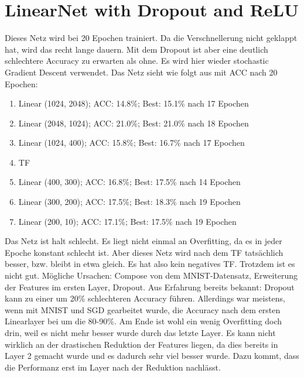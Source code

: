 \section{LinearNet with Dropout and ReLU}
    Dieses Netz wird bei 20 Epochen trainiert. Da die Verschnellerung nicht geklappt hat, 
    wird das recht lange dauern. Mit dem Dropout ist aber eine deutlich schlechtere Accuracy 
    zu erwarten als ohne. Es wird hier wieder stochastic Gradient Descent verwendet. 
    Das Netz sieht wie folgt aus mit ACC nach 20 Epochen: 
    \begin{enumerate}
        \item Linear (1024, 2048); ACC: 14.8\%; Best: 15.1\% nach 17 Epochen
        \item Linear (2048, 1024); ACC: 21.0\%; Best: 21.0\% nach 18 Epochen
        \item Linear (1024, 400); ACC: 15.8\%; Best: 16.7\% nach 17 Epochen
        \item TF
        \item Linear (400, 300); ACC: 16.8\%; Best: 17.5\% nach 14 Epochen
        \item Linear (300, 200); ACC: 17.5\%; Best: 18.3\% nach 19 Epochen
        \item Linear (200, 10); ACC: 17.1\%; Best: 17.5\% nach 19 Epochen
    \end{enumerate}
    Das Netz ist halt schlecht. Es liegt nicht einmal an Overfitting, da es in jeder Epoche 
    konstant schlecht ist.
    Aber dieses Netz wird nach dem TF tatsächlich besser, bzw. bleibt in etwa gleich. 
    Es hat also kein negatives TF. Trotzdem ist es nicht gut. Mögliche Ursachen: 
    Compose von dem MNIST-Datensatz, Erweiterung der Features im ersten Layer, Dropout. 
    Aus Erfahrung bereits bekannt: Dropout kann zu einer um 20\% schlechteren Accuracy 
    führen. 
    Allerdings war meistens, wenn mit MNIST und SGD gearbeitet wurde, die Accuracy nach dem 
    ersten Linearlayer bei um die 80-90\%. 
    Am Ende ist wohl ein wenig Overfitting doch drin, weil es nicht mehr besser wurde durch 
    das letzte Layer. Es kann nicht wirklich an der drastischen Reduktion der Features liegen, 
    da dies bereits in Layer 2 gemacht wurde und es dadurch sehr viel besser wurde. Dazu kommt, 
    dass die Performanz erst im Layer nach der Reduktion nachlässt.
